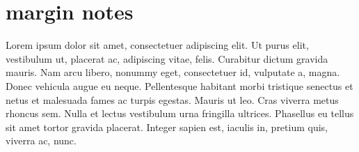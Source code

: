 \documentclass{article}
\begin{document}
	\section{margin notes}
		\par
			Lorem ipsum dolor sit amet, consectetuer adipiscing elit. Ut purus elit, vestibulum ut, placerat ac,
adipiscing vitae, felis. Curabitur dictum gravida mauris. Nam arcu libero, nonummy eget, consectetuer
id, vulputate a, magna. Donec vehicula augue eu neque. Pellentesque habitant morbi tristique senectus
et netus et malesuada fames ac turpis egestas. Mauris ut leo. Cras viverra metus rhoncus sem. Nulla
et lectus vestibulum urna fringilla ultrices. Phasellus eu tellus sit amet tortor gravida placerat. Integer
sapien est, iaculis in, pretium quis, viverra ac, nunc.
	
\end{document}

